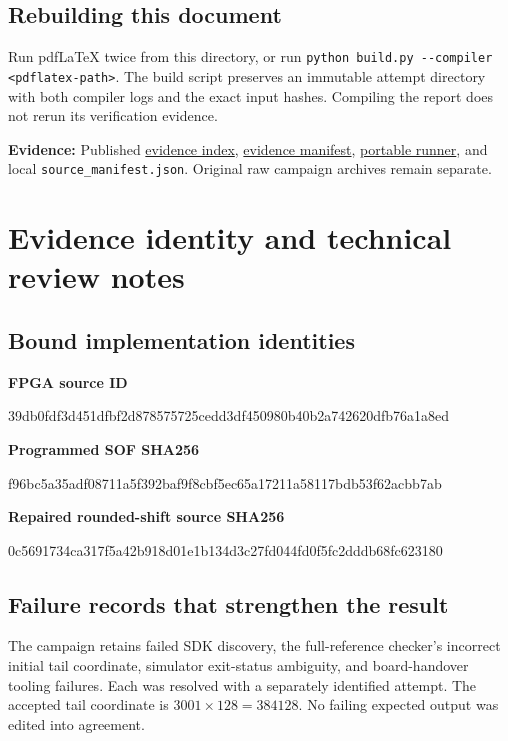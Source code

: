 \documentclass[11pt,letterpaper]{article}
\newcommand{\page}[1]{\clearpage\section{#1}}
\newcommand{\evidence}[1]{\par{\footnotesize\raggedright\sloppy\color{muted}\textbf{Evidence:} #1\par}}
\newcommand{\epath}[1]{\nolinkurl{#1}}
\begin{document}
\subsection{Rebuilding this document}
Run pdfLaTeX twice from this directory, or run \texttt{python build.py -{}-compiler <pdflatex-path>}. The build script preserves an immutable attempt directory with both compiler logs and the exact input hashes. Compiling the report does not rerun its verification evidence.
\evidence{Published \href{../../results/verification_20261017/README.md}{evidence index}, \href{../../results/verification_20261017/manifest.json}{evidence manifest}, \href{../../../verification/tsh2/README.md}{portable runner}, and local \epath{source_manifest.json}. Original raw campaign archives remain separate.}

\page{Evidence identity and technical review notes}
\subsection{Bound implementation identities}
\textbf{FPGA source ID}\par
{\footnotesize\ttfamily 39db0fdf3d451dfbf2d878575725cedd3df450980b40b2a742620dfb76a1a8ed}\par
\textbf{Programmed SOF SHA256}\par
{\footnotesize\ttfamily f96bc5a35adf08711a5f392baf9f8cbf5ec65a17211a58117bdb53f62acbb7ab}\par
\textbf{Repaired rounded-shift source SHA256}\par
{\footnotesize\ttfamily 0c5691734ca317f5a42b918d01e1b134d3c27fd044fd0f5fc2dddb68fc623180}\par
\subsection{Failure records that strengthen the result}
The campaign retains failed SDK discovery, the full-reference checker's incorrect initial tail coordinate, simulator exit-status ambiguity, and board-handover tooling failures. Each was resolved with a separately identified attempt. The accepted tail coordinate is $3001\times128=384128$. No failing expected output was edited into agreement.
\end{document}
